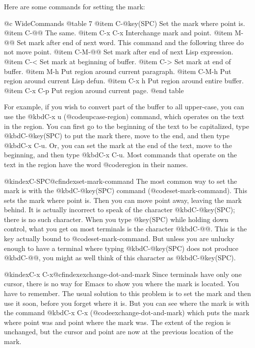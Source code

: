 {{{{  Here are some commands for setting the mark:

@c WideCommands
@table 7
@item C-@key(SPC)
Set the mark where point is.
@item C-@@
The same.
@item C-x C-x
Interchange mark and point.
@item M-@@
Set mark after end of next word.  This command and the following
three do not move point.
@item C-M-@@
Set mark after end of next Lisp expression.
@item C-<
Set mark at beginning of buffer.
@item C->
Set mark at end of buffer.
@item M-h
Put region around current paragraph.
@item C-M-h
Put region around current Lisp defun.
@item C-x h
Put region around entire buffer.
@item C-x C-p
Put region around current page.
@end table

  For example, if you wish to convert part of the buffer to all upper-case,
you can use the @kbd{C-x u} (@code{upcase-region}) command, which operates on the text in the
region.  You can first go to the beginning of the text to be capitalized,
type @kbd{C-@key(SPC)} to put the mark there, move to the end, and then
type @kbd{C-x C-u}.  Or, you can set the mark at the end of the text, move
to the beginning, and then type @kbd{C-x C-u}.  Most commands that operate
on the text in the region have the word @code{region} in their names.

@kindex{C-SPC}@cfindex{set-mark-command}
  The most common way to set the mark is with the @kbd{C-@key(SPC)}
command (@code{set-mark-command}).  This sets the mark where point is.
Then you can move point away, leaving the mark behind.  It is actually
incorrect to speak of the character @kbd{C-@key(SPC)}; there is no
such character.  When you type @key(SPC) while holding down control,
what you get on most terminals is the character @kbd{C-@@}.  This is
the key actually bound to @code{set-mark-command}.  But unless you
are unlucky enough to have a terminal where typing @kbd{C-@key(SPC)}
does not produce @kbd{C-@@}, you might as well think of this character
as @kbd{C-@key(SPC)}.

@kindex{C-x C-x}@cfindex{exchange-dot-and-mark}
  Since terminals have only one cursor, there is no way for Emacs to show
you where the mark is located.  You have to remember.  The usual solution
to this problem is to set the mark and then use it soon, before you forget
where it is.  But you can see where the mark is with the command @kbd{C-x
C-x} (@code{exchange-dot-and-mark}) which puts the mark where point was and
point where the mark was.  The extent of the region is unchanged, but the
cursor and point are now at the previous location of the mark.

}}}}
